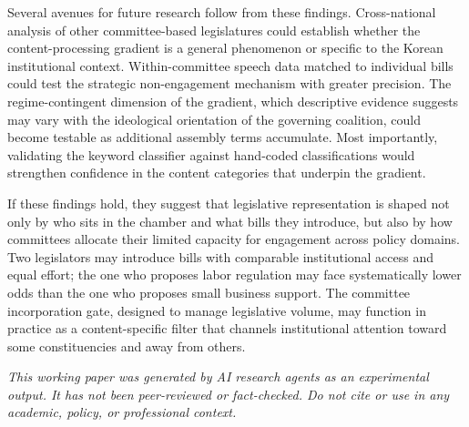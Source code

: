 \documentclass[11pt]{article}
\begin{document}
Several avenues for future research follow from these findings. Cross-national analysis of other committee-based legislatures could establish whether the content-processing gradient is a general phenomenon or specific to the Korean institutional context. Within-committee speech data matched to individual bills could test the strategic non-engagement mechanism with greater precision. The regime-contingent dimension of the gradient, which descriptive evidence suggests may vary with the ideological orientation of the governing coalition, could become testable as additional assembly terms accumulate. Most importantly, validating the keyword classifier against hand-coded classifications would strengthen confidence in the content categories that underpin the gradient.

If these findings hold, they suggest that legislative representation is shaped not only by who sits in the chamber and what bills they introduce, but also by how committees allocate their limited capacity for engagement across policy domains. Two legislators may introduce bills with comparable institutional access and equal effort; the one who proposes labor regulation may face systematically lower odds than the one who proposes small business support. The committee incorporation gate, designed to manage legislative volume, may function in practice as a content-specific filter that channels institutional attention toward some constituencies and away from others.

\bigskip
\noindent\textit{This working paper was generated by AI research agents as an
experimental output. It has not been peer-reviewed or fact-checked.
Do not cite or use in any academic, policy, or professional context.}





\end{document}

